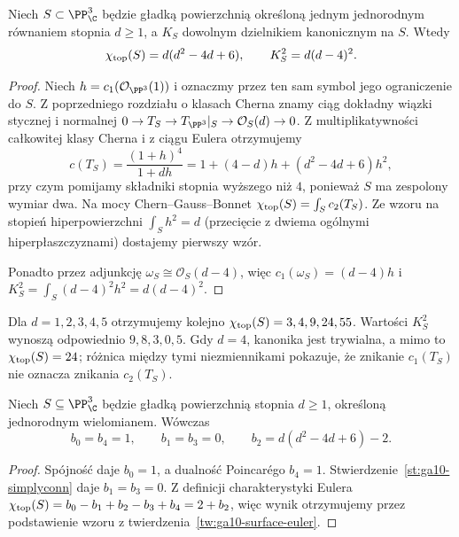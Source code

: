 \begin{twierdzenie}
\label{tw:ga10-surface-euler}
Niech $S\subset\PP^3_\C$ będzie gładką powierzchnią
określoną jednym jednorodnym równaniem stopnia $d\ge1$,
a $K_S$ dowolnym dzielnikiem kanonicznym na $S$.
Wtedy
\[
 \chi_{\rm top}(S)=d(d^2-4d+6),\qquad
 K_S^2=d(d-4)^2.
\]
\end{twierdzenie}
\begin{proof}
Niech $h=c_1(\mathcal O_{\PP^3}(1))$ i oznaczmy przez ten sam
symbol jego ograniczenie do $S$.
Z poprzedniego rozdziału o klasach Cherna znamy ciąg dokładny
wiązki stycznej i normalnej
$0\to T_S\to T_{\PP^3}|_S\to\mathcal O_S(d)\to0$.
Z multiplikatywności całkowitej klasy Cherna i z ciągu Eulera
otrzymujemy
\[
 c(T_S)=\frac{(1+h)^4}{1+dh}
 =1+(4-d)h+(d^2-4d+6)h^2,
\]
przy czym pomijamy składniki stopnia wyższego niż $4$,
ponieważ $S$ ma zespolony wymiar dwa.
Na mocy Chern--Gauss--Bonnet
$\chi_{\rm top}(S)=\int_S c_2(T_S)$.
Ze wzoru na stopień hiperpowierzchni
$\int_S h^2=d$ (przecięcie z dwiema ogólnymi
hiperpłaszczyznami) dostajemy pierwszy wzór.

Ponadto przez adjunkcję
$\omega_S\cong\mathcal O_S(d-4)$, więc
$c_1(\omega_S)=(d-4)h$ i
$K_S^2=\int_S (d-4)^2h^2=d(d-4)^2$.
\end{proof}

\begin{przyklad}
Dla $d=1,2,3,4,5$ otrzymujemy kolejno
$\chi_{\rm top}(S)=3,4,9,24,55$.
Wartości $K_S^2$ wynoszą odpowiednio $9,8,3,0,5$.
Gdy $d=4$, kanonika jest trywialna, a mimo to
$\chi_{\rm top}(S)=24$; różnica między tymi niezmiennikami
pokazuje, że znikanie $c_1(T_S)$ nie oznacza znikania
$c_2(T_S)$.
\end{przyklad}

\begin{stwierdzenie}
\label{st:ga10-betti}
Niech $S\subseteq\PP^3_\C$ będzie gładką powierzchnią
stopnia $d\ge1$, określoną jednorodnym wielomianem.
Wówczas
\[
 b_0=b_4=1,\qquad b_1=b_3=0,\qquad
 b_2=d(d^2-4d+6)-2.
\]
\end{stwierdzenie}
\begin{proof}
Spójność daje $b_0=1$, a dualność Poincarégo $b_4=1$.
Stwierdzenie~\ref{st:ga10-simplyconn} daje $b_1=b_3=0$.
Z definicji charakterystyki Eulera
$\chi_{\rm top}(S)=b_0-b_1+b_2-b_3+b_4=2+b_2$,
więc wynik otrzymujemy przez podstawienie
wzoru z twierdzenia~\ref{tw:ga10-surface-euler}.
\end{proof}

